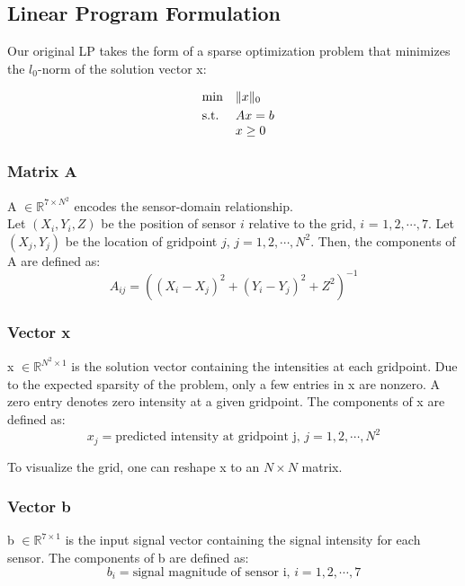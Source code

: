 \documentclass[a4paper]{article}
\begin{document}
\subsection{Linear Program Formulation}

Our original LP takes the form of a sparse optimization problem that minimizes the $l_0$-norm of the solution vector x:

\begin{equation}
\centering
  \begin{array}{ll@{}r@{}r@{}l}
    \text{min} & \|x\|_0 \\[\jot]
    \text{s.t.}& Ax = b \\
    & \multicolumn{4}{l}{x \geq 0}
  \end{array}
\end{equation}

\subsubsection*{Matrix A}
A $\in \mathbb{R}^{7 \times N^2}$ encodes the sensor-domain relationship. \\Let $(X_i, Y_i, Z)$ be the position of sensor $i$ relative to the grid, $i$ = $1,2, \cdots , 7$. Let $(X_j, Y_j)$ be the location of gridpoint $j$, $j = 1,2, \cdots , N^2$. Then, the components of A are defined as: 
\[
A_{ij}=((X_{i}-X_{j})^2+(Y_{i}-Y_{j})^2+Z^2)^{-1}
\]

\subsubsection*{Vector x}
x $\in \mathbb{R}^{N^2 \times 1}$ is the solution vector containing the intensities at each gridpoint. Due to the expected sparsity of the problem, only a few entries in x are nonzero. A zero entry denotes zero intensity at a given gridpoint. The components of x are defined as: 
\[
x_j = \text{predicted intensity at gridpoint j, } j = 1,2, \cdots, N^2
\]

To visualize the grid, one can reshape x to an $N \times N$ matrix.

\subsubsection*{Vector b}
b $\in \mathbb{R}^{7 \times 1}$ is the input signal vector containing the signal intensity for each sensor. The components of b are defined as: 
\[
b_i = \text{signal magnitude of sensor i, }i = 1,2, \cdots, 7
\]
\end{document}
